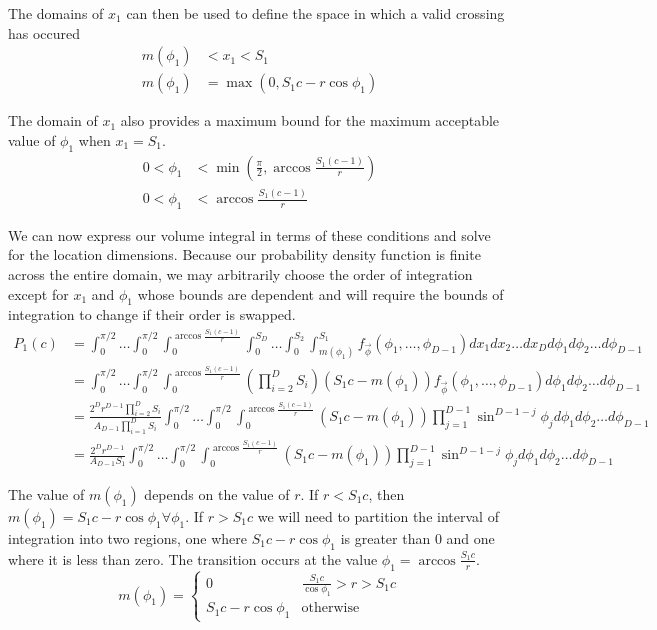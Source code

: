 \documentclass{article}
\begin{document}
The domains of $x_1$ can then be used to define the space in which a valid crossing has occured 
\begin{align} 
	m(\phi_1) &< x_1 < S_1 \\ \label{eq:crossing condition 0}
	m(\phi_1) &= \max(0, S_1c-r\cos{\phi_1}) 
\end{align}

The domain of $x_1$ also provides a maximum bound for the maximum acceptable value of $\phi_1$ when $x_1 = S_1$.
\begin{align}
	0 < \phi_1 &< \min\left(\frac{\pi}{2}, \arccos{\frac{S_1(c-1)}{r}}\right) \\
	0 < \phi_1 &< \arccos{\frac{S_1(c-1)}{r}}
\end{align}

We can now express our volume integral in terms of these conditions and solve for the location dimensions. Because our probability density function is finite across the entire domain, we may arbitrarily choose the order of integration except
for $x_1$ and $\phi_1$ whose bounds are dependent and will require the bounds of integration to change if their order is swapped.
\begin{align} \label{eq:volume integral}
	P_1(c) &= \int_0^{\pi/2} \hdots \int_0^{\pi/2} \int_0^{\arccos{\frac{S_1(c-1)}{r}}}\int_0^{S_D} \hdots \int_0^{S_2} \int_{m(\phi_1)}^{S_1} f_{\vec\phi}(\phi_1,\hdots,\phi_{D-1})dx_1 dx_2 \hdots dx_D d\phi_1 d\phi_2 \hdots d\phi_{D-1}\\
	&= \int_0^{\pi/2} \hdots \int_0^{\pi/2}\int_0^{\arccos{\frac{S_1(c-1)}{r}}}\left(\prod_{i=2}^DS_i\right)\left(S_1c-m(\phi_1)\right)  f_{\vec\phi}(\phi_1,\hdots,\phi_{D-1}) d\phi_1 d\phi_2 \hdots d\phi_{D-1} \\
	&= \frac{ 2^Dr^{D-1} \prod_{i=2}^DS_i}{A_{D-1}\prod_{i=1}^DS_i}\int_0^{\pi/2} \hdots \int_0^{\pi/2}\int_0^{\arccos{\frac{S_1(c-1)}{r}}} (S_1c-m(\phi_1)) \prod_{j=1}^{D-1}\sin^{D-1-j}\phi_j d\phi_1 d\phi_2\hdots d\phi_{D-1}\\
	&= \frac{ 2^Dr^{D-1}}{A_{D-1}S_1}\int_0^{\pi/2} \hdots \int_0^{\pi/2}\int_0^{\arccos{\frac{S_1(c-1)}{r}}} (S_1c-m(\phi_1)) \prod_{j=1}^{D-1}\sin^{D-1-j}\phi_j d\phi_1 d\phi_2 \hdots d\phi_{D-1}
\end{align}

The value of $m(\phi_1)$ depends on the value of $r$. If $r<S_1c$, then $m(\phi_1)=S_1c-r\cos \phi_1 \forall \phi_1$. If $r>S_1c$ we will need to partition the interval of integration into
two regions, one where $S_1c-r\cos{\phi_1}$ is greater than 0 and one where it is less than zero. The transition occurs at the value $\phi_1 = \arccos{\frac{S_1c}{r}}$.
\begin{equation}
	m(\phi_1) = \begin{cases}
		0 & \frac{S_1c}{\cos\phi_1}>r>S_1c\\
		S_1c - r\cos{\phi_1} & \text{otherwise}
	\end{cases}
\end{equation}
\end{document}
